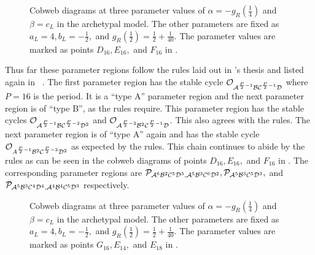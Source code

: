 \begin{figure}
	\centering
	\caption[Cobweb diagrams of the archetypal model]{
		Cobweb diagrams at three parameter values of $\alpha = -g_R\left(\frac{1}{4}\right)$ and $\beta = c_L$ in the archetypal model.
		The other parameters are fixed as $a_L = 4, b_L = -\frac{1}{2},$ and $g_R\left(\frac{1}{2}\right) = \frac{1}{2} + \frac{1}{40}$.
		The parameter values are marked as points $D_{16}, E_{16},$ and $F_{16}$ in .
	}
	\label{fig:arch.dyn.cobwebs.2}
\end{figure}

Thus far these parameter regions follow the rules laid out in 's thesis and listed again in ~\Cite{akyuz2022}.
The first parameter region has the stable cycle $\mathcal{O}_{\mathcal{A}^{\frac{P}{2} - 1}\mathcal{B}\mathcal{C}^{\frac{P}{2} - 1}\mathcal{D}}$ where $P = 16$ is the period.
It is a ``type A'' parameter region and the next parameter region is of ``type B'', as the rules require.
This parameter region has the stable cycles $\mathcal{O}_{\mathcal{A}^{\frac{P}{2} - 1}\mathcal{B}\mathcal{C}^{\frac{P}{2} - 2}\mathcal{D}^2}$ and $\mathcal{O}_{\mathcal{A}^{\frac{P}{2} - 2}\mathcal{B}^2\mathcal{C}^{\frac{P}{2} - 1}\mathcal{D}}$.
This also agrees with the rules.
The next parameter region is of ``type A'' again and has the stable cycle $\mathcal{O}_{A^{\frac{P}{2} - 1}\mathcal{B}^2\mathcal{C}^{\frac{P}{2} - 2}\mathcal{D}^2}$ as expected by the rules.
This chain continues to abide by the rules as can be seen in the cobweb diagrams of points $D_{16}, E_{16},$ and $F_{16}$ in .
The corresponding parameter regions are $\mathcal{P}_{\mathcal{A}^6\mathcal{B}^2\mathcal{C}^5\mathcal{D}^3, \mathcal{A}^5\mathcal{B}^3\mathcal{C}^6\mathcal{D}^2}, \mathcal{P}_{\mathcal{A}^5\mathcal{B}^3\mathcal{C}^5\mathcal{D}^3},$ and $\mathcal{P}_{\mathcal{A}^5\mathcal{B}^3\mathcal{C}^4\mathcal{D}^4, \mathcal{A}^4\mathcal{B}^4\mathcal{C}^5\mathcal{D}^3}$ respectively.

\begin{figure}
	\centering
	\caption[Cobweb diagrams of the archetypal model]{
		Cobweb diagrams at three parameter values of $\alpha = -g_R\left(\frac{1}{4}\right)$ and $\beta = c_L$ in the archetypal model.
		The other parameters are fixed as $a_L = 4, b_L = -\frac{1}{2},$ and $g_R\left(\frac{1}{2}\right) = \frac{1}{2} + \frac{1}{40}$.
		The parameter values are marked as points $G_{16}, E_{14},$ and $E_{18}$ in .
	}
	\label{fig:arch.dyn.cobwebs.3}
\end{figure}


